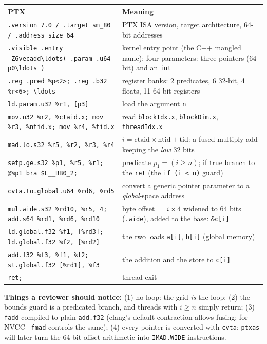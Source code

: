 \documentclass[10pt,a4paper,openany,oneside]{report}
\begin{document}
\begin{center}\small
\begin{xltabular}{\textwidth}{@{}L{5.4cm}Y@{}}
\toprule
\textbf{PTX} & \textbf{Meaning}\\
\midrule\endhead
\texttt{.version 7.0 / .target sm\_80 / .address\_size 64} & PTX ISA version, target architecture, 64-bit addresses\\
\texttt{.visible .entry \_Z6vecadd\textbackslash{}ldots( .param .u64 p0\textbackslash{}ldots )} & kernel entry point (the C++ mangled name); four parameters: three pointers (64-bit) and an \texttt{int}\\
\texttt{.reg .pred \%p<2>; .reg .b32 \%r<6>; \textbackslash{}ldots} & register banks: 2 predicates, 6 32-bit, 4 floats, 11 64-bit registers\\
\texttt{ld.param.u32 \%r1, [p3]} & load the argument \texttt{n}\\
\texttt{mov.u32 \%r2, \%ctaid.x; mov \%r3, \%ntid.x; mov \%r4, \%tid.x} & read \texttt{blockIdx.x}, \texttt{blockDim.x}, \texttt{threadIdx.x}\\
\texttt{mad.lo.s32 \%r5, \%r2, \%r3, \%r4} & $i=\mathrm{ctaid}\times\mathrm{ntid}+\mathrm{tid}$: a fused multiply-add keeping the \emph{low} 32 bits\\
\texttt{setp.ge.s32 \%p1, \%r5, \%r1; @\%p1 bra \$L\_\_BB0\_2;} & predicate $p_1=(i\ge n)$; if true branch to the \texttt{ret} (the \texttt{if (i < n)} guard)\\
\texttt{cvta.to.global.u64 \%rd6, \%rd5} & convert a generic pointer parameter to a \emph{global}-space address\\
\texttt{mul.wide.s32 \%rd10, \%r5, 4; add.s64 \%rd1, \%rd6, \%rd10} & byte offset $=i\times4$ widened to 64 bits (\texttt{.wide}), added to the base: \texttt{\&c[i]}\\
\texttt{ld.global.f32 \%f1, [\%rd3]; ld.global.f32 \%f2, [\%rd2]} & the two loads \texttt{a[i]}, \texttt{b[i]} (global memory)\\
\texttt{add.f32 \%f3, \%f1, \%f2; st.global.f32 [\%rd1], \%f3} & the addition and the store to \texttt{c[i]}\\
\texttt{ret;} & thread exit\\
\bottomrule
\end{xltabular}
\end{center}
\textbf{Things a reviewer should notice:} (1) no loop: the grid \emph{is} the loop; (2) the bounds guard is a predicated branch, and threads with $i\ge n$ simply return; (3) \texttt{fadd} compiled to plain \texttt{add.f32} (clang's default contraction allows fusing; for NVCC \texttt{--fmad} controls the same); (4) every pointer is converted with \texttt{cvta}; \texttt{ptxas} will later turn the 64-bit offset arithmetic into \texttt{IMAD.WIDE} instructions.
\end{document}
